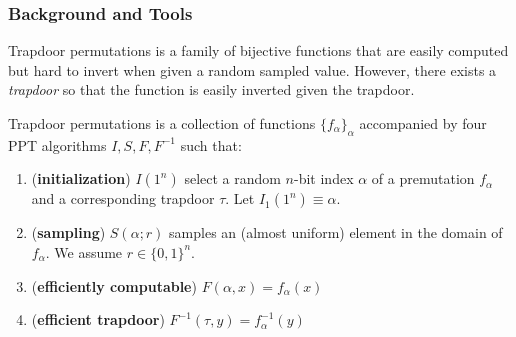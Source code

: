 \subsubsection{Background and Tools}
Trapdoor permutations  is a family of bijective functions that are easily computed but hard to invert when given a random sampled value. However, there exists a \textit{trapdoor} so that the function is easily inverted given the trapdoor.
\begin{definition}
Trapdoor permutations is a collection of functions $\{f_\alpha\}_\alpha$ accompanied by four PPT algorithms $I,S,F,F^{-1}$ such that:
\begin{enumerate}
\item (\textbf{initialization}) $I(1^n)$ select a random $n$-bit index $\alpha$ of a premutation $f_\alpha$ and a corresponding trapdoor $\tau$. Let $I_1(1^n)\equiv\alpha$.
\item (\textbf{sampling}) $S(\alpha;r)$ samples an (almost uniform) element in the domain of $f_\alpha$. We assume $r\in\{0,1\}^n$.
\item (\textbf{efficiently computable}) $F(\alpha,x)=f_\alpha(x)$
\item (\textbf{efficient trapdoor}) $F^{-1}(\tau,y)=f^{-1}_\alpha(y)$
\end{enumerate}
\end{definition}


